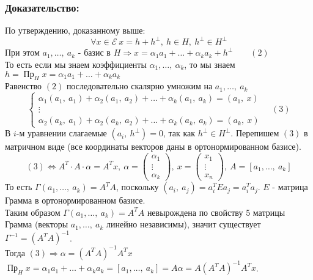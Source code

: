 \documentclass[12pt, letterpaper, twoside]{article}
\begin{document}
    \subsubsection*{Доказательство:}
    По утверждению, доказанному выше:
    \[\forall x\in \mathcal{E}\ x = h + h^{\bot},\ h\in H,\ h^{\bot}\in H^{\bot}\]
    При этом $a_1,\dots,\ a_k$ - базис в $H\Rightarrow x = \alpha_1 a_1 + \dots + \alpha_k a_k + h^{\bot}\qquad (2)$\\
    То есть если мы знаем коэффициенты $\alpha_1,\dots,\ \alpha_k$, то мы знаем\\
    $h = \operatorname{\text{Пр}}_H x = \alpha_1 a_1 + \dots + \alpha_k a_k$\\
    Равенство $(2)$ последовательно скалярно умножим на $a_1,\dots,\ a_k$
    \[\begin{cases}
        \alpha_1 (a_1,\ a_1) + \alpha_2 (a_1,\ a_2) + \dots + \alpha_k (a_1,\ a_k) = (a_1,\ x)\\
        \vdots\\
        \alpha_2 (a_k,\ a_1) + \alpha_2 (a_k,\ a_2) + \dots + \alpha_k (a_k,\ a_k) = (a_k,\ x) 
    \end{cases}\quad (3)\]
    В $i$-м уравнении слагаемые $(a_i,\ h^{\bot}) = 0$, так как $h^{\bot}\in H^{\bot}$. Перепишем $(3)$ в матричном виде (все координаты векторов даны в ортонормированном базисе).
    \[(3)\Leftrightarrow A^T\cdot A\cdot \alpha = A^T x,\ \alpha = \begin{pmatrix}
        \alpha_1\\
        \vdots\\
        \alpha_k
    \end{pmatrix},\ x = \begin{pmatrix}
        x_1\\
        \vdots\\
        x_n
    \end{pmatrix},\ A = [a_1,\dots,\ a_k]\]
    То есть $\Gamma(a_1,\dots,\ a_k) = A^T A$, поскольку $(a_i,\ a_j) = a_i^TEa_j = a_i^T a_j$. $E$ - матрица Грамма в ортонормированном базисе.\\
    Таким образом $\Gamma(a_1,\dots,\ a_k) = A^T A$ невырождена по свойству 5 матрицы Грамма (векторы $a_1,\dots,\ a_k$ линейно независимы), значит существует $\Gamma^{-1} = (A^T A)^{-1}$.\\
    Тогда $(3)\Rightarrow \alpha = (A^{T}A)^{-1}A^{T} x$\\
    $\operatorname{\text{Пр}}_H x = \alpha_1 a_1 + \dots + \alpha_k a_k = [a_1,\dots,\ a_k] = A\alpha = A(A^T A)^{-1}A^T x$.
\end{document}
